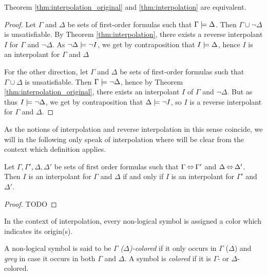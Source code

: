 \begin{prop}
	Theorem \ref{thm:interpolation_original} and \ref{thm:interpolation} are equivalent.
	\label{prop:interpolations_equivalent}
\end{prop}
\begin{proof}
	Let $\Gamma$ and $\Delta$ be sets of first-order formulas such that $ \Gamma \models \Delta$.
	Then $\Gamma \cup \lnot \Delta$ is unsatisfiable.
	By Theorem \ref{thm:interpolation}, there exists a reverse interpolant $I$ for $\Gamma$ and $\lnot \Delta$.
	As $\lnot \Delta \models \lnot I$, we get by contraposition that $I \models \Delta$, hence $I$ is an interpolant for $\Gamma$ and $\Delta$

	For the other direction,
	let $\Gamma$ and $\Delta$ be sets of first-order formulas such that $ \Gamma \cup \Delta$ is unsatisfiable.
	Then $\Gamma \models \lnot \Delta$, hence by Theorem \ref{thm:interpolation_original}, there exists an interpolant $I$ of $\Gamma$ and $\lnot \Delta$.
	But as thus $ I\models \lnot \Delta$, we get by contraposition that $\Delta \models \lnot I$, so $I$ is a reverse interpolant for $\Gamma$ and $\Delta$.
\end{proof}

As the notions of interpolation and reverse interpolation in this sense coincide, we will in the following only speak of interpolation where  will be clear from the context which definition applies.

\begin{lemma}
	\label{lemma:logically_equivalent_sets}
	Let $\Gamma, \Gamma', \Delta, \Delta'$ be sets of first order formulas such that $\Gamma \operatorname{\Leftrightarrow} \Gamma'$ and $\Delta \operatorname{\Leftrightarrow} \Delta'$.
	Then $I$ is an interpolant for $\Gamma$ and $\Delta$ if and only if $I$ is an interpolant for $\Gamma'$ and $\Delta'$.
\end{lemma}
\begin{proof}
	TODO
\end{proof}

In the context of interpolation, every non-logical symbol is assigned a color which indicates its origin(s). 
\begin{defi}[Coloring]
A non-logical symbol is said to be \emph{$\Gamma$ ($\Delta$)-colored} if it only occurs in $\Gamma$ ($\Delta$) and \emph{grey} in case it occurs in both $\Gamma$ and $\Delta$. A symbol is \emph{colored} if it is $\Gamma$- or $\Delta$-colored.
\end{defi}
